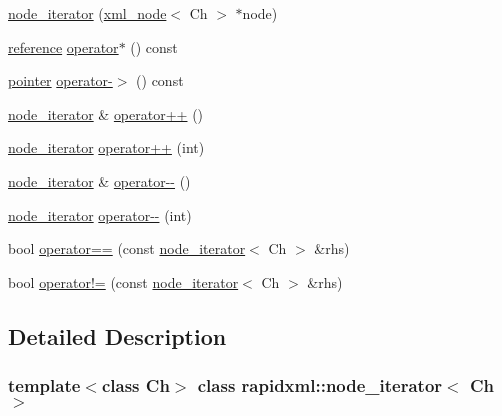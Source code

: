 \begin{DoxyCompactItemize}
\item 
\mbox{\hyperlink{classrapidxml_1_1node__iterator_a94c3da59b54e4bd003e226cc35b3c266}{node\+\_\+iterator}} (\mbox{\hyperlink{classrapidxml_1_1xml__node}{xml\+\_\+node}}$<$ Ch $>$ $\ast$node)
\item 
\mbox{\hyperlink{classrapidxml_1_1node__iterator_ad7fabbcb7d3d9e4e220299c5475b9e9c}{reference}} \mbox{\hyperlink{classrapidxml_1_1node__iterator_a47a076383ce706bb88e2b455646d8555}{operator$\ast$}} () const
\item 
\mbox{\hyperlink{classrapidxml_1_1node__iterator_a65dca8bca2b9c29f635b9ad0bdeeecb9}{pointer}} \mbox{\hyperlink{classrapidxml_1_1node__iterator_a203f946893733b2f8526b49c3c9039ef}{operator-\/$>$}} () const
\item 
\mbox{\hyperlink{classrapidxml_1_1node__iterator}{node\+\_\+iterator}} \& \mbox{\hyperlink{classrapidxml_1_1node__iterator_a8d6b184a76b2ec8a8b5e90bc013c80ed}{operator++}} ()
\item 
\mbox{\hyperlink{classrapidxml_1_1node__iterator}{node\+\_\+iterator}} \mbox{\hyperlink{classrapidxml_1_1node__iterator_ad01b4e43e348a330984833fd4924d0f2}{operator++}} (int)
\item 
\mbox{\hyperlink{classrapidxml_1_1node__iterator}{node\+\_\+iterator}} \& \mbox{\hyperlink{classrapidxml_1_1node__iterator_ace52107ecd1bcf02e49619e86206e3a3}{operator-\/-\/}} ()
\item 
\mbox{\hyperlink{classrapidxml_1_1node__iterator}{node\+\_\+iterator}} \mbox{\hyperlink{classrapidxml_1_1node__iterator_a4ca35716bb7865f199a137b063af6080}{operator-\/-\/}} (int)
\item 
bool \mbox{\hyperlink{classrapidxml_1_1node__iterator_a5cb8a3b0d65a1a2517995e986a4debfd}{operator==}} (const \mbox{\hyperlink{classrapidxml_1_1node__iterator}{node\+\_\+iterator}}$<$ Ch $>$ \&rhs)
\item 
bool \mbox{\hyperlink{classrapidxml_1_1node__iterator_a20f1e25347d7e3856694f18597f7c8e2}{operator!=}} (const \mbox{\hyperlink{classrapidxml_1_1node__iterator}{node\+\_\+iterator}}$<$ Ch $>$ \&rhs)
\end{DoxyCompactItemize}


\subsection{Detailed Description}
\subsubsection*{template$<$class Ch$>$\newline
class rapidxml\+::node\+\_\+iterator$<$ Ch $>$}

